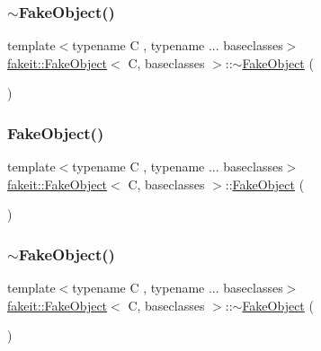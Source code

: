 \subsubsection{\texorpdfstring{$\sim$FakeObject()}{~FakeObject()}\hspace{0.1cm}{\footnotesize\ttfamily [2/9]}}
{\footnotesize\ttfamily template$<$typename C , typename ... baseclasses$>$ \\
\mbox{\hyperlink{classfakeit_1_1FakeObject}{fakeit\+::\+Fake\+Object}}$<$ C, baseclasses $>$\+::$\sim$\mbox{\hyperlink{classfakeit_1_1FakeObject}{Fake\+Object}} (\begin{DoxyParamCaption}{ }\end{DoxyParamCaption})\hspace{0.3cm}{\ttfamily [inline]}}

\mbox{\label{classfakeit_1_1FakeObject_ad705c5388b4354d1fdeef0bdd0151167}} 
\subsubsection{\texorpdfstring{FakeObject()}{FakeObject()}\hspace{0.1cm}{\footnotesize\ttfamily [3/9]}}
{\footnotesize\ttfamily template$<$typename C , typename ... baseclasses$>$ \\
\mbox{\hyperlink{classfakeit_1_1FakeObject}{fakeit\+::\+Fake\+Object}}$<$ C, baseclasses $>$\+::\mbox{\hyperlink{classfakeit_1_1FakeObject}{Fake\+Object}} (\begin{DoxyParamCaption}{ }\end{DoxyParamCaption})\hspace{0.3cm}{\ttfamily [inline]}}

\mbox{\label{classfakeit_1_1FakeObject_abfc9604c62598655fdefcc98a329dbbf}} 
\subsubsection{\texorpdfstring{$\sim$FakeObject()}{~FakeObject()}\hspace{0.1cm}{\footnotesize\ttfamily [3/9]}}
{\footnotesize\ttfamily template$<$typename C , typename ... baseclasses$>$ \\
\mbox{\hyperlink{classfakeit_1_1FakeObject}{fakeit\+::\+Fake\+Object}}$<$ C, baseclasses $>$\+::$\sim$\mbox{\hyperlink{classfakeit_1_1FakeObject}{Fake\+Object}} (\begin{DoxyParamCaption}{ }\end{DoxyParamCaption})\hspace{0.3cm}{\ttfamily [inline]}}

